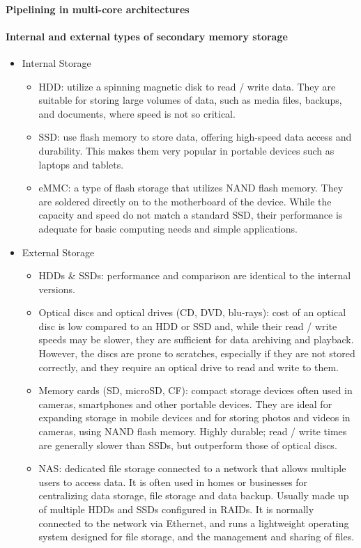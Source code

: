 \documentclass[a4paper,12pt]{article}
\begin{document}
\paragraph{Pipelining in multi-core architectures}
\paragraph{Internal and external types of secondary memory storage}
\begin{itemize}
	\item Internal Storage
	\begin{itemize}
	\item HDD: utilize a spinning magnetic disk to read / write data. They are suitable for storing large volumes of data, such as media files, backups, and documents, where speed is not so critical. 
	\item SSD: use flash memory to store data, offering high-speed data access and durability. This makes them very popular in portable devices such as laptops and tablets.
	\item eMMC: a type of flash storage that utilizes NAND flash memory. They are soldered directly on to the motherboard of the device. While the capacity and speed do not match a standard SSD, their performance is adequate for basic computing needs and simple applications. 
\end{itemize}
	\item External Storage
\begin{itemize}
\item HDDs \& SSDs: performance and comparison are identical to the internal versions. 
\item Optical discs and optical drives (CD, DVD, blu-rays): cost of an optical disc is low compared to an HDD or SSD and, while their read / write speeds may be slower, they are sufficient for data archiving and playback. However, the discs are prone to scratches, especially if they are not stored correctly, and they require an optical drive to read and write to them.
\item Memory cards (SD, microSD, CF): compact storage devices often used in cameras, smartphones and other portable devices. They are ideal for expanding storage in mobile devices and for storing photos 
and videos in cameras, using NAND flash memory. Highly durable; read / write times are generally slower 
than SSDs, but outperform those of optical discs. 
\item NAS: dedicated file storage connected to a network that allows multiple users to access 
data. It is often used in homes or businesses for centralizing data storage, file storage 
and data backup. Usually made up of multiple HDDs and SSDs configured in RAIDs. It is normally connected to the network via Ethernet, and runs a lightweight operating system designed for file storage, and the management and sharing of files. 
\end{itemize}
\end{itemize}
\end{document}
